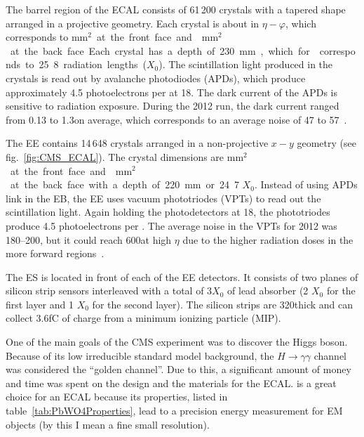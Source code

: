 The barrel region of the ECAL consists of 61\,200 crystals with a tapered shape arranged in a projective geometry. Each crystal is about  in $\eta-\varphi$, which corresponds to \unit{mm$^{\text{2}}$} at the front face and \unit{mm$^{\text{2}}$} at the back face. Each crystal has a depth of 230\mm, which for \PbWO corresponds to 25.8 radiation lengths ($X_{0}$). The scintillation light produced in the crystals is read out by avalanche photodiodes (APDs), which produce approximately 4.5 photoelectrons per \MeVns at 18\degC. The dark current of the APDs is sensitive to radiation exposure. During the 2012 run, the dark current ranged from 0.13 to 1.3\muA on average, which corresponds to an average noise of 47 to 57\mev~\cite{CMS:2013ecal}.

The EE contains 14\,648 \PbWO crystals arranged in a non-projective $x-y$ geometry (see fig.~\ref{fig:CMS_ECAL}). The crystal dimensions are \unit{mm$^{\text{2}}$} at the front face and \unit{mm$^{\text{2}}$} at the back face with a depth of 220\mm or 24.7 $X_{0}$. Instead of using APDs link in the EB, the EE uses vacuum phototriodes (VPTs) to read out the scintillation light. Again holding the photodetectors at 18\degC, the phototriodes produce 4.5 photoelectrons per \MeVns. The average noise in the VPTs for 2012 was 180--200\mev, but it could reach 600\mev at high $\eta$ due to the higher radiation doses in the more forward regions~\cite{CMS:2013ecal}.

The ES is located in front of each of the EE detectors. It consists of two planes of silicon strip sensors interleaved with a total of $3 X_0$ of lead absorber (2 $X_{0}$ for the first layer and 1 $X_{0}$ for the second layer). The silicon strips are 320\mum thick and can collect 3.6\unit{fC} of charge from a minimum ionizing particle (MIP).

One of the main goals of the CMS experiment was to discover the Higgs boson.
Because of its low irreducible standard model background, the $H\rightarrow\gamma\gamma$ channel was considered the ``golden channel''.
Due to this, a significant amount of money and time was spent on the design and the materials for the ECAL.
\PbWO is a great choice for an ECAL because its properties, listed in table~\ref{tab:PbWO4Properties}, lead to a precision energy measurement for EM objects (by this I mean a fine small resolution). 

%
%
%
%
%
%
%
%
%
%
%
%
%
%
%

